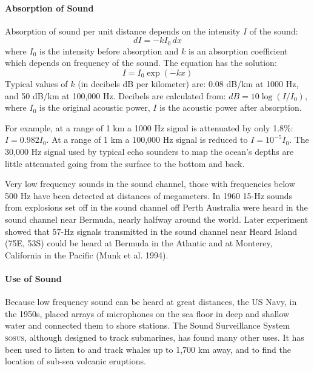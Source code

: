 \paragraph{Absorption of Sound}
Absorption of sound per unit distance
depends on the intensity $I$ of the sound:
\begin{equation}
dI = -k I_0 \, dx
\end{equation}
where $I_0$ is the intensity before absorption and $k$ is an
absorption coefficient which depends on frequency of the sound. The
equation has the solution:
\begin{equation}
I = I_0 \exp(-kx)
\end{equation}
Typical values of $k$ (in decibels dB per kilometer) are: 0.08 dB/km
at 1000 Hz, and 50 dB/km at 100,000 Hz. Decibels are calculated from:
$dB = 10 \log(I/I_0)$, where $I_0$ is the original acoustic power, $I$
is the acoustic power after absorption.

For example, at a range of 1 km a 1000 Hz signal is attenuated by only
1.8\%: $I = 0.982 I_0$. At a range of 1 km a 100,000 Hz signal is
reduced to $I = 10^{-5} I_0$. The 30,000 Hz signal used by typical
echo sounders to map the ocean's depths are little attenuated going
from the surface to the bottom and back.

Very low frequency sounds in the sound channel,
those with frequencies below 500 Hz have been detected at distances of
megameters. In 1960 15-Hz sounds from explosions set off in the sound
channel off Perth Australia were heard in the
sound channel near Bermuda, nearly halfway around the world. Later
experiment showed that 57-Hz signals transmitted in the sound channel
near Heard Island (75\degrees E, 53\degrees S) could be heard at
Bermuda in the Atlantic and at Monterey, California in the Pacific
(Munk et al. 1994).

\paragraph{Use of Sound}
Because low frequency sound can be heard at great
distances, the US Navy, in the 1950s, placed arrays of microphones on
the sea floor in deep and shallow water and connected them to shore
stations. The Sound Surveillance System \textsc{sosus}, although
designed to track submarines, has found many other uses. It has been
used to listen to and track whales up to 1,700 km away, and to find
the location of sub-sea volcanic eruptions.

